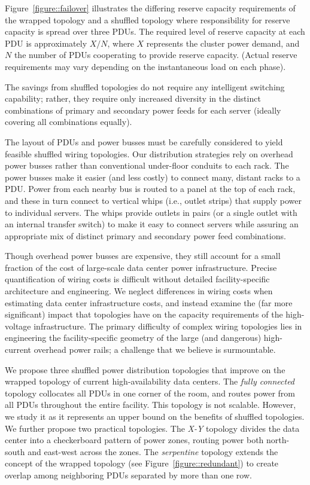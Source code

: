 Figure~\ref{figure::failover} illustrates the differing reserve capacity requirements of the wrapped topology and a shuffled topology where responsibility for reserve capacity is spread over three PDUs.  The required level of reserve capacity at each PDU is approximately $X / N$, where $X$ represents the cluster power demand, and $N$ the number of PDUs cooperating to provide reserve capacity. (Actual reserve requirements may vary depending on the instantaneous load on each phase).

The savings from shuffled topologies do not require any intelligent switching capability; rather, they require only increased diversity in the distinct combinations of primary and secondary power feeds for each server (ideally covering all combinations equally).   

The layout of PDUs and power busses must be carefully considered to yield feasible shuffled wiring topologies.   Our distribution strategies rely on overhead power busses \cite{Rasmussen129} rather than conventional under-floor conduits to each rack.  The power busses make it easier (and less costly) to connect many, distant racks to a PDU.  Power from each nearby bus is routed to a panel at the top of each rack, and these in turn connect to vertical whips (i.e., outlet strips) that supply power to individual servers.  The whips provide outlets in pairs (or a single outlet with an internal transfer switch) to make it easy to connect servers while assuring an appropriate mix of distinct primary and secondary power feed combinations.

Though overhead power busses are expensive, they still account for a small fraction of the cost of large-scale data center power infrastructure.  Precise quantification of wiring costs is difficult without detailed facility-specific architecture and engineering. We neglect differences in wiring costs when estimating data center infrastructure costs, and instead examine the (far more significant) impact that topologies have on the capacity requirements of the high-voltage infrastructure.  The primary difficulty of complex wiring topologies lies in engineering the facility-specific geometry of the large (and dangerous) high-current overhead power rails; a challenge that we believe is surmountable.

We propose three shuffled power distribution topologies that improve on the wrapped topology of current high-availability data centers.  The \emph{fully connected} topology collocates all PDUs in one corner of the room, and routes power from all PDUs throughout the entire facility.  This topology is not scalable. However, we study it as it represents an upper bound on the benefits of shuffled topologies. We further propose two practical topologies.  The \emph{X-Y} topology divides the data center into a checkerboard pattern of power zones, routing power both north-south and east-west across the zones.  The \emph{serpentine} topology extends the concept of the wrapped topology (see Figure~\ref{figure::redundant}) to create overlap among neighboring PDUs separated by more than one row.

